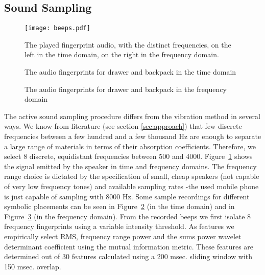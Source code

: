 \subsection{Sound Sampling}

\begin{figure}[t]
\centering  
\texttt{[image: beeps.pdf]}
\caption[Audio fingerprint sample]{The played fingerprint audio, with the distinct frequencies, on the left in the time domain, on 
the right in the frequency domain.}
\label{fig:beeps}
\end{figure}

\begin{figure}[t]
  \begin{center}
   \end{center}
\vspace{-10pt}
\caption[Time domain audio fingerprint examples]{
The audio fingerprints for drawer and backpack in the time domain}
\label{fig:soundfing}
\vspace{-10pt}
\end{figure} 


\begin{figure}[t]
  \begin{center}
     \end{center}
\vspace{-10pt}
\caption[Frequency domain audio fingerprint examples]{
The audio fingerprints for drawer and backpack in the frequency domain}
\label{fig:soundfingt}
\vspace{-10pt}
\end{figure} 

The active sound sampling procedure differs from 
the vibration method in several 
ways. We know from literature (see section \ref{sec:approach}) that
few discrete frequencies between a few hundred and a few thousand Hz are enough to separate a large range of
materials in terms of their absorption coefficients. Therefore, we 
select 8 discrete, equidistant frequencies 
between 500 and 4000. Figure~\ref{fig:beeps} shows the signal emitted by the speaker in time and frequency domains. 
The frequency range choice is dictated
by the specification of small, cheap speakers (not capable of very low
frequency tones) and available sampling rates -the used mobile phone is just capable of sampling
with 8000 Hz. Some sample recordings for different symbolic placements can be seen in
Figure~\ref{fig:soundfing} (in the time domain) and in Figure~\ref{fig:soundfingt} (in the frequency domain). 
From the recorded beeps we first isolate 8 frequency fingerprints
using a variable intensity threshold. As features we empirically select
RMS, frequency range power and the sums power wavelet determinant
coefficient using the mutual information metric. These features 
are determined out of 30 features calculated using a 200
msec. sliding window with 150 msec. overlap.

